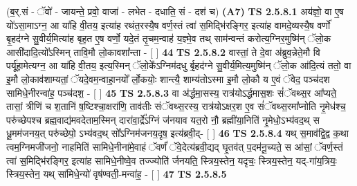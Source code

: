\documentclass[17pt]{extarticle}
\begin{document}
                  \newline
                      (ब॒र्.सं - ॅवो॑ - जायन्ते॒ प्रवो॒ वाजा॑ - लभेत - दधाति॒ सं - दश॑ च)  \textbf{(A7)} \newline \newline
                                        \textbf{ TS 2.5.8.1} \newline
                  अय॑ज्ञो॒ वा ए॒ष यो॑ऽसा॒माऽग्न॒ आ या॑हि वी॒तय॒ इत्या॑ह रथंत॒रस्यै॒ष वर्ण॒स्तं त्वा॑ स॒मिद्भि॑रङ्गिर॒ इत्या॑ह वामदे॒व्यस्यै॒ष वर्णो॑ बृ॒हद॑ग्ने सु॒वीर्य॒मित्या॑ह बृह॒त ए॒ष वर्णो॒ यदे॒तं तृ॒चम॒न्वाह॑ य॒ज्ञ्मे॒व तथ् साम॑न्वन्तं करोत्य॒ग्निर॒मुष्मि॑न् ॅलो॒क आसी॑दादि॒त्यो᳚ऽस्मिन् तावि॒मौ लो॒कावशा᳚न्ता - [  ] \textbf{  44} \newline
                  \newline
                                \textbf{ TS 2.5.8.2} \newline
                  वास्तां॒ ते दे॒वा अ॑ब्रुव॒न्नेते॒मौ वि पर्यू॑हा॒मेत्यग्न॒ आ या॑हि वी॒तय॒ इत्य॒स्मिन् ॅलो॒के᳚ऽग्निम॑दधु र्बृ॒हद॑ग्ने सु॒वीर्य॒मित्य॒मुष्मि॑न् ॅलो॒क आ॑दि॒त्यं ततो॒ वा इ॒मौ लो॒काव॑शाम्यतां॒ ॅयदे॒वम॒न्वाहा॒नयो᳚ र्लो॒कयोः॒ शान्त्यै॒ शाम्य॑तोऽस्मा इ॒मौ लो॒कौ य ए॒वं ॅवेद॒ पञ्च॑दश सामिधे॒नीरन्वा॑ह॒ पञ्च॑दश॒ - [  ] \textbf{  45} \newline
                  \newline
                                \textbf{ TS 2.5.8.3} \newline
                  वा अ॑र्द्धमा॒सस्य॒ रात्र॑योऽर्द्धमास॒शः सं॑ॅवथ्स॒र आ᳚प्यते॒ तासां॒ त्रीणि॑ च श॒तानि॑ ष॒ष्टिश्चा॒क्षरा॑णि॒ ताव॑तीः संॅवथ्स॒रस्य॒ रात्र॑योऽक्षर॒श ए॒व सं॑ॅवथ्स॒रमा᳚प्नोति नृ॒मेध॑श्च॒ परु॑च्छेपश्च ब्रह्म॒वाद्य॑मवदेताम॒स्मिन् दारा॑वा॒र्द्रे᳚ऽग्निं ज॑नयाव यत॒रो नौ॒ ब्रह्मी॑या॒निति॑ नृ॒मेधो॒ऽभ्य॑वद॒थ् स धू॒मम॑जनय॒त् परु॑च्छेपो॒ ऽभ्य॑वद॒थ् सो᳚ऽग्निम॑जनय॒दृष॒ इत्य॑ब्रवी॒द्-  [  ] \textbf{  46} \newline
                  \newline
                                \textbf{ TS 2.5.8.4} \newline
                  यथ् स॒माव॑द्वि॒द्व क॒था त्वम॒ग्निमजी॑जनो॒ नाहमिति॑ सामिधे॒नीना॑मे॒वाहं ॅवर्णं॑ ॅवे॒देत्य॑ब्रवी॒द्यद् घृ॒तव॑त् प॒दम॑नू॒च्यते॒ स आ॑सां॒ ॅवर्ण॒स्तं त्वा॑ स॒मिद्भि॑रङ्गिर॒ इत्या॑ह सामिधे॒नीष्वे॒व तज्ज्योति॑ र्जनयति॒ स्त्रिय॒स्तेन॒ यदृचः॒ स्त्रिय॒स्तेन॒ यद्-गा॑य॒त्रियः॒ स्त्रिय॒स्तेन॒ यथ् सा॑मिधे॒न्यो॑ वृष॑ण्वती॒-मन्वा॑ह॒ - [  ] \textbf{  47} \newline
                  \newline
                                \textbf{ TS 2.5.8.5} \newline
\end{document}
